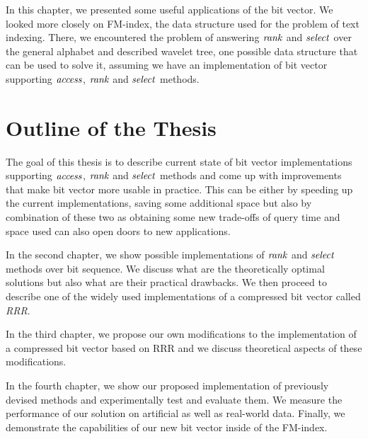 In this chapter, we presented some useful applications of the bit vector. We looked more closely on
FM-index, the data structure used for the problem of text indexing. There, we encountered the
problem of answering $\mathit{rank}$ and $\mathit{select}$ over the general alphabet and described wavelet tree,
one possible data structure that can be used to solve it, assuming we have an implementation of
bit vector supporting $\mathit{access}$, $\mathit{rank}$ and $\mathit{select}$ methods.

\section{Outline of the Thesis}

The goal of this thesis is to describe current state of bit vector implementations
supporting $\mathit{access}$, $\mathit{rank}$ and $\mathit{select}$ methods and come up with improvements that
make bit vector more usable in practice. This can be either by speeding up the current
implementations, saving some additional space but also by combination of these two as
obtaining some new trade-offs of query time and space used can also open doors to new
applications.

In the second chapter, we show possible implementations of $\mathit{rank}$ and $\mathit{select}$ methods
over bit sequence. We discuss what are the theoretically optimal solutions but also what
are their practical drawbacks. We then proceed to describe one of the widely used
implementations of a compressed bit vector called \textit{RRR}.

In the third chapter, we propose our own modifications to the implementation of
a compressed bit vector based on RRR and we discuss theoretical aspects of these
modifications.

In the fourth chapter, we show our proposed implementation of previously devised
methods and experimentally test and evaluate them. We measure the performance
of our solution on artificial as well as real-world data. Finally, we demonstrate
the capabilities of our new bit vector inside of the FM-index.
